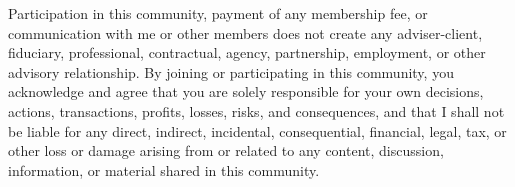 \documentclass[11pt]{ctexart}
\begin{document}
{Participation in this community, payment of any membership fee, or communication with me or other members does not create any adviser-client, fiduciary, professional, contractual, agency, partnership, employment, or other advisory relationship. By joining or participating in this community, you acknowledge and agree that you are solely responsible for your own decisions, actions, transactions, profits, losses, risks, and consequences, and that I shall not be liable for any direct, indirect, incidental, consequential, financial, legal, tax, or other loss or damage arising from or related to any content, discussion, information, or material shared in this community.\par
}
\end{document}
